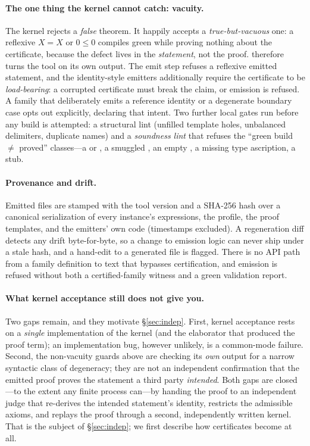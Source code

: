 \paragraph{The one thing the kernel cannot catch: vacuity.} The kernel rejects a
\emph{false} theorem. It happily accepts a \emph{true-but-vacuous} one: a reflexive
$X = X$ or $0 \le 0$ compiles green while proving nothing about the certificate,
because the defect lives in the \emph{statement}, not the proof. \Telperion{}
therefore turns the tool on its own output. The emit step refuses a reflexive
emitted statement, and the identity-style emitters additionally require the
certificate to be \emph{load-bearing}: a corrupted certificate must break the
claim, or emission is refused. A family that deliberately emits a reference
identity or a degenerate boundary case opts out explicitly, declaring that intent.
Two further local gates run before any build is attempted: a structural lint
(unfilled template holes, unbalanced delimiters, duplicate names) and a
\emph{soundness lint} that refuses the ``green build $\ne$ proved'' classes---a
 or , a smuggled , an empty , a
missing type ascription, a  stub.

\paragraph{Provenance and drift.} Emitted files are stamped with the tool version
and a SHA-256 hash over a canonical serialization of every instance's expressions,
the \Lean{} profile, the proof templates, and the emitters' own code (timestamps
excluded). A regeneration diff detects any drift byte-for-byte, so a change to
emission logic can never ship under a stale hash, and a hand-edit to a generated
file is flagged. There is no API path from a family definition to \Lean{} text that
bypasses certification, and emission is refused without both a certified-family
witness and a green validation report.

\paragraph{What kernel acceptance still does not give you.} Two gaps remain, and
they motivate \S\ref{sec:indep}. First, kernel acceptance rests on a \emph{single}
implementation of the kernel (and the elaborator that produced the proof term);
an implementation bug, however unlikely, is a common-mode failure. Second, the
non-vacuity guards above are \Telperion{} checking its \emph{own} output for a
narrow syntactic class of degeneracy; they are not an independent confirmation
that the emitted proof proves the statement a third party \emph{intended}. Both
gaps are closed---to the extent any finite process can---by handing the proof to
an independent judge that re-derives the intended statement's identity, restricts
the admissible axioms, and replays the proof through a second, independently
written kernel. That is the subject of \S\ref{sec:indep}; we first describe how
certificates become \Lean{} at all.
